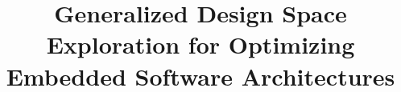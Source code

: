 \documentclass[conference]{IEEEtran}
\begin{document}
%
\title{Generalized Design Space Exploration for Optimizing Embedded Software Architectures}




% 








\maketitle
\end{document}
